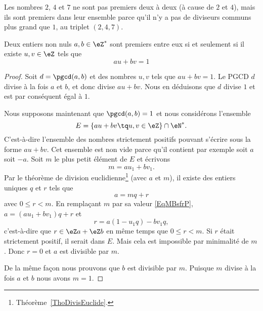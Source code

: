 Les nombres \( 2\), \( 4\) et \( 7\) ne sont pas premiers deux à deux (à cause de \( 2\) et \( 4\)), mais ils sont premiers dans leur ensemble parce qu'il n'y a pas de diviseurs communs plus grand que \( 1\), au triplet \( (2, 4, 7)\).

\begin{theorem} \label{ThoBuNjam}
    Deux entiers non nuls \( a,b\in\eZ^*\) sont premiers entre eux si et seulement si il existe \( u,v\in\eZ\) tels que
    \begin{equation}
        au+bv=1
    \end{equation}
\end{theorem}

\begin{proof}
    Soit \( d=\pgcd(a,b)\) et des nombres \( u,v\) tels que \( au+bv=1\). Le PGCD \( d\) divise à la fois \( a\) et \( b\), et donc divise \( au+bv\). Nous en déduisons que \( d\) divise \( 1\) et est par conséquent égal à \( 1\).

    Nous supposons maintenant que \( \pgcd(a,b)=1\) et nous considérons l'ensemble
    \begin{equation}
        E=\{ au+bv\tq u,v\in \eZ \}\cap \eN^*.
    \end{equation}
    C'est-à-dire l'ensemble des nombres strictement positifs pouvant s'écrire sous la forme \( au+bv\). Cet ensemble est non vide parce qu'il contient par exemple soit \( a\) soit \( -a\). Soit \( m\) le plus petit élément de \( E\) et écrivons
    \begin{equation}    \label{EqMBsfrP}
        m=au_1+bv_1.
    \end{equation}
    Par le théorème de division euclidienne\footnote{Théorème~\ref{ThoDivisEuclide}.} (avec \( a\) et \( m\)), il existe des entiers uniques $q$ et $r$ tels que
    \begin{equation}
        a=mq+r
    \end{equation}
    avec \( 0\leq r<m\). En remplaçant \( m\) par sa valeur \eqref{EqMBsfrP}, \( a=(au_1+bv_1)q+r\) et
    \begin{equation}
        r=a(1-u_1q)-bv_1q,
    \end{equation}
    c'est-à-dire que \( r\in \eZ a+\eZ b\) en même temps que \( 0\leq r<m\). Si \( r\) était strictement positif, il serait dans \( E\). Mais cela est impossible par minimalité de \( m\). Donc \( r=0\) et \( a\) est divisible par \( m\).

    De la même façon nous prouvons que \( b\) est divisible par \( m\). Puisque \( m\) divise à la fois \( a\) et \( b\) nous avons \( m=1\).
\end{proof}

